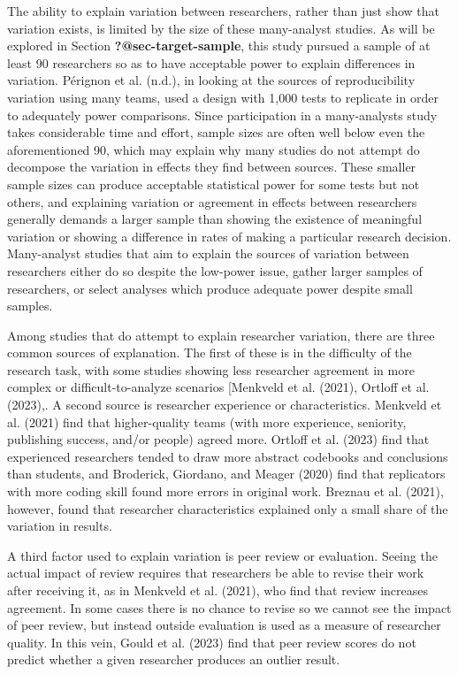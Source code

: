 \documentclass[
  letterpaper,
  DIV=11,
  numbers=noendperiod]{scrartcl}
\begin{document}
The ability to explain variation between researchers, rather than just
show that variation exists, is limited by the size of these many-analyst
studies. As will be explored in Section \textbf{?@sec-target-sample},
this study pursued a sample of at least 90 researchers so as to have
acceptable power to explain differences in variation. Pérignon et al.
(n.d.), in looking at the sources of reproducibility variation using
many teams, used a design with 1,000 tests to replicate in order to
adequately power comparisons. Since participation in a many-analysts
study takes considerable time and effort, sample sizes are often well
below even the aforementioned 90, which may explain why many studies do
not attempt do decompose the variation in effects they find between
sources. These smaller sample sizes can produce acceptable statistical
power for some tests but not others, and explaining variation or
agreement in effects between researchers generally demands a larger
sample than showing the existence of meaningful variation or showing a
difference in rates of making a particular research decision.
Many-analyst studies that aim to explain the sources of variation
between researchers either do so despite the low-power issue, gather
larger samples of researchers, or select analyses which produce adequate
power despite small samples.

Among studies that do attempt to explain researcher variation, there are
three common sources of explanation. The first of these is in the
difficulty of the research task, with some studies showing less
researcher agreement in more complex or difficult-to-analyze scenarios
{[}Menkveld et al. (2021), Ortloff et al. (2023),. A second source is
researcher experience or characteristics. Menkveld et al. (2021) find
that higher-quality teams (with more experience, seniority, publishing
success, and/or people) agreed more. Ortloff et al. (2023) find that
experienced researchers tended to draw more abstract codebooks and
conclusions than students, and Broderick, Giordano, and Meager (2020)
find that replicators with more coding skill found more errors in
original work. Breznau et al. (2021), however, found that researcher
characteristics explained only a small share of the variation in
results.

A third factor used to explain variation is peer review or evaluation.
Seeing the actual impact of review requires that researchers be able to
revise their work after receiving it, as in Menkveld et al. (2021), who
find that review increases agreement. In some cases there is no chance
to revise so we cannot see the impact of peer review, but instead
outside evaluation is used as a measure of researcher quality. In this
vein, Gould et al. (2023) find that peer review scores do not predict
whether a given researcher produces an outlier result.
\end{document}
